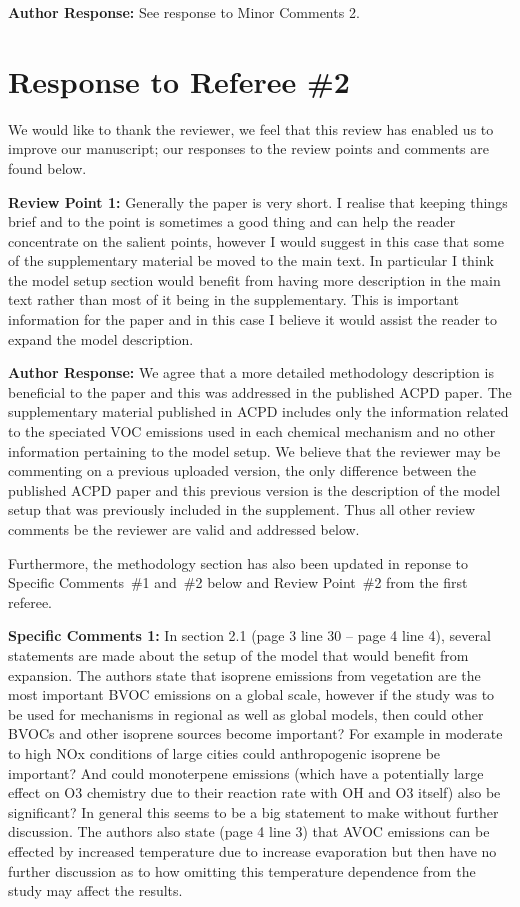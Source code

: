 \documentclass{article}
\begin{document}
\textbf{Author Response:} See response to Minor Comments 2.

\newpage
\section*{Response to Referee \#2}

We would like to thank the reviewer, we feel that this review has enabled us to improve our manuscript; our responses to the review points and comments are found below.

\textbf{Review Point 1:}  Generally the paper is very short. I realise that keeping things brief and to the point is sometimes a good thing and can help the reader concentrate on the salient points, however I would suggest in this case that some of the supplementary material be moved to the main text. In particular I think the model setup section would benefit from having more description in the main text rather than most of it being in the supplementary. This is important information for the paper and in this case I believe it would assist the reader to expand the model description.

\textbf{Author Response:} We agree that a more detailed methodology description is beneficial to the paper and this was addressed in the published ACPD paper. 
The supplementary material published in ACPD includes only the information related to the speciated VOC emissions used in each chemical mechanism and no other information pertaining to the model setup. 
We believe that the reviewer may be commenting on a previous uploaded version, the only difference between the published ACPD paper and this previous version is the description of the model setup that was previously included in the supplement.
Thus all other review comments be the reviewer are valid and addressed below. 

Furthermore, the methodology section has also been updated in reponse to Specific Comments~\#1 and~\#2 below and Review Point~\#2 from the first referee.

\textbf{Specific Comments 1:}  In section 2.1 (page 3 line 30 – page 4 line 4), several statements are made about the setup of the model that would benefit from expansion. The authors state that isoprene emissions from vegetation are the most important BVOC emissions on a global scale, however if the study was to be used for mechanisms in regional as well as global models, then could other BVOCs and other isoprene sources become important? For example in moderate to high NOx conditions of large cities could anthropogenic isoprene be important? And could monoterpene emissions (which have a potentially large effect on O3 chemistry due to their reaction rate with OH and O3 itself) also be significant? In general this seems to be a big statement to make without further discussion. The authors also state (page 4 line 3) that AVOC emissions can be effected by increased temperature due to increase evaporation but then have no further discussion as to how omitting this temperature dependence from the study may affect the results.
\end{document}
